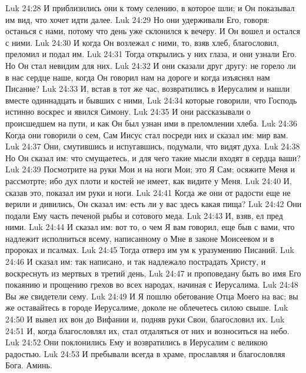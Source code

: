 \vs Luk 24:28 И приблизились они к тому селению, в которое шли; и Он показывал им вид, что хочет идти далее.
\vs Luk 24:29 Но они удерживали Его, говоря: останься с нами, потому что день уже склонился к вечеру. И Он вошел и остался с ними.
\vs Luk 24:30 И когда Он возлежал с ними, то, взяв хлеб, благословил, преломил и подал им.
\vs Luk 24:31 Тогда открылись у них глаза, и они узнали Его. Но Он стал невидим для них.
\vs Luk 24:32 И они сказали друг другу: не горело ли в нас сердце наше, когда Он говорил нам на дороге и когда изъяснял нам Писание?
\vs Luk 24:33 И, встав в тот же час, возвратились в Иерусалим и нашли вместе одиннадцать  и бывших с ними,
\vs Luk 24:34 которые говорили, что Господь истинно воскрес и явился Симону.
\vs Luk 24:35 И они рассказывали о происшедшем на пути, и как Он был узнан ими в преломлении хлеба.
\rsbpar\vs Luk 24:36 Когда они говорили о сем, Сам Иисус стал посреди них и сказал им: мир вам.
\vs Luk 24:37 Они, смутившись и испугавшись, подумали, что видят духа.
\vs Luk 24:38 Но Он сказал им: что смущаетесь, и для чего такие мысли входят в сердца ваши?
\vs Luk 24:39 Посмотрите на руки Мои и на ноги Мои; это Я Сам; осяжите Меня и рассмотрте; ибо дух плоти и костей не имеет, как видите у Меня.
\vs Luk 24:40 И, сказав это, показал им руки и ноги.
\vs Luk 24:41 Когда же они от радости еще не верили и дивились, Он сказал им: есть ли у вас здесь какая пища?
\vs Luk 24:42 Они подали Ему часть печеной рыбы и сотового меда.
\vs Luk 24:43 И, взяв, ел пред ними.
\vs Luk 24:44 И сказал им: вот то, о чем Я вам говорил, еще быв с вами, что надлежит исполниться всему, написанному о Мне в законе Моисеевом и в пророках и псалмах.
\vs Luk 24:45 Тогда отверз им ум к уразумению Писаний.
\vs Luk 24:46 И сказал им: так написано, и так надлежало пострадать Христу, и воскреснуть из мертвых в третий день,
\vs Luk 24:47 и проповедану быть во имя Его покаянию и прощению грехов во всех народах, начиная с Иерусалима.
\vs Luk 24:48 Вы же свидетели сему.
\vs Luk 24:49 И Я пошлю обетование Отца Моего на вас; вы же оставайтесь в городе Иерусалиме, доколе не облечетесь силою свыше.
\rsbpar\vs Luk 24:50 И вывел их вон  до Вифании и, подняв руки Свои, благословил их.
\vs Luk 24:51 И, когда благословлял их, стал отдаляться от них и возноситься на небо.
\vs Luk 24:52 Они поклонились Ему и возвратились в Иерусалим с великою радостью.
\vs Luk 24:53 И пребывали всегда в храме, прославляя и благословляя Бога. Аминь.
